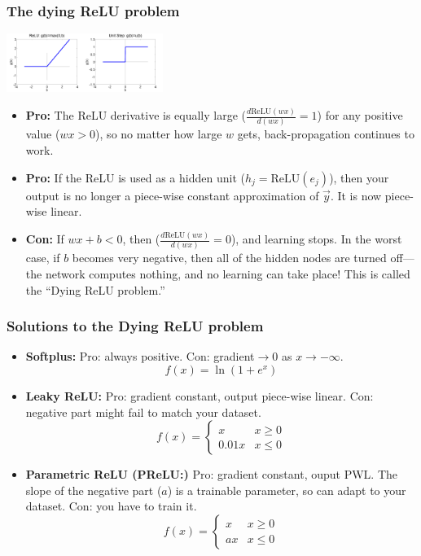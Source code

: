 \documentclass{beamer}
\begin{document}
\begin{frame}
  \frametitle{The dying ReLU problem}
  \centerline{\includegraphics[width=1in]{figs/nn_relu.png}\includegraphics[width=1in]{figs/nn_unitstep.png}}

  \begin{itemize}
    \item {\bf Pro:} The ReLU derivative is equally large
      ($\frac{d\mbox{ReLU}(wx)}{d(wx)}=1$) for any positive value
      ($wx>0$), so no matter how large $w$ gets, back-propagation
      continues to work.
    \item {\bf Pro:} If the ReLU is used as a hidden unit
      ($h_j=\mbox{ReLU}(e_j)$), then your output is no longer a
      piece-wise constant approximation of $\vec{y}$.  It is now
      piece-wise linear.
    \item {\bf Con:} If $wx+b<0$, then
      ($\frac{d\mbox{ReLU}(wx)}{d(wx)}=0$), and learning stops.
      In the worst case, if $b$ becomes very negative, then all of the
      hidden nodes are turned off---the network computes nothing, and
      no learning can take place!  This is called the ``Dying ReLU
      problem.''
  \end{itemize}
\end{frame}

\begin{frame}
  \frametitle{Solutions to the Dying ReLU problem}

  \begin{itemize}
  \item {\bf Softplus:}  Pro: always positive.  Con: gradient$\rightarrow 0$ as $x\rightarrow -\infty$.
    \[
    f(x) = \ln\left(1+e^x\right)
    \]
  \item {\bf Leaky ReLU:} Pro: gradient constant, output piece-wise linear.  Con:
    negative part might fail to match your dataset.
    \[
    f(x) = \begin{cases}
      x & x \ge 0\\
      0.01x & x \le 0
    \end{cases}
    \]
  \item {\bf Parametric ReLU (PReLU:)} Pro: gradient constant, ouput
    PWL.  The slope of the negative part ($a$) is a trainable
    parameter, so can adapt to your dataset.  Con: you have to train it.
    \[
    f(x) = \begin{cases}
      x & x \ge 0\\
      ax & x \le 0
    \end{cases}
    \]
  \end{itemize}
\end{frame}
\end{document}
